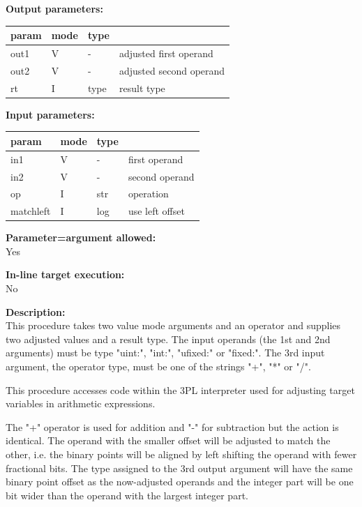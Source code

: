         {\bf Output parameters:} \\
        \begin{tabular}{| l | l | l | l |}
        \hline
        param  & mode     & type & \\
        \hline \hline
        out1   & V        & -    & adjusted first operand   \\ \hline
        out2   & V        & -    & adjusted second operand  \\ \hline
        rt     & I        & type & result type              \\ \hline
        \end{tabular}
        
        {\bf Input parameters:} \\
        \begin{tabular}{| l | l | l | l |}
        \hline
        param      & mode & type & \\
        \hline \hline
        in1        & V    & -    & first operand   \\ \hline
        in2        & V    & -    & second operand  \\ \hline
        op         & I    & str  & operation       \\ \hline
        matchleft  & I    & log  & use left offset \\ \hline
        \end{tabular}
        
        {\bf Parameter=argument allowed:} \\
        Yes
        
        {\bf In-line target execution:} \\
        No
        
        {\bf Description:} \\
        This procedure takes two value mode arguments and an operator and
        supplies two adjusted values and a result type. The input operands
        (the 1st and 2nd arguments) must be type "uint:", "int:", "ufixed:"
        or "fixed:". The 3rd input argument, the operator type, must be
        one of the strings "+", "*" or "/".
        
        This procedure accesses code within the 3PL interpreter used for
        adjusting target variables in arithmetic expressions.
        
        The "+" operator is used for addition and "-" for subtraction but the
        action is identical. The operand with the smaller offset will be
        adjusted to match the other, i.e. the binary points will be aligned
        by left shifting the operand with fewer fractional bits. The type
        assigned to the 3rd output argument will have the same binary point
        offset as the now-adjusted operands and the integer part will be
        one bit wider than the operand with the largest integer part.
        
